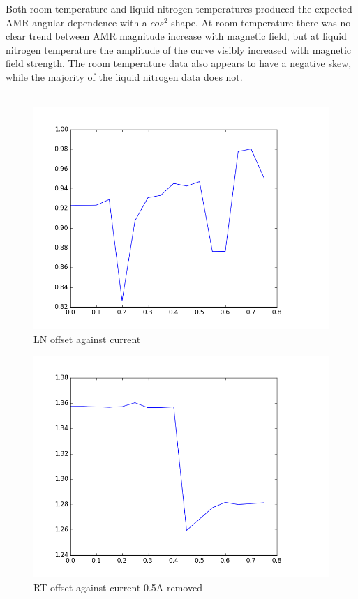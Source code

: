\documentclass[10pt, twocolumn]{revtex4}
\begin{document}
Both room temperature and liquid nitrogen temperatures produced the expected AMR angular dependence with a $cos^2$ shape. At room temperature there was no clear trend between  AMR magnitude increase with magnetic field, but at liquid nitrogen temperature the amplitude of the curve visibly increased with magnetic field strength. The room temperature data also appears to have a negative skew, while the majority of the liquid nitrogen data does not.\\
\\
\begin{figure}[H]
	\centering
	\includegraphics[width = \columnwidth]{LN_offsets.png}
	\caption{LN offset against current}
	\label{fig:horiz_LN_offset}
\end{figure}

\begin{figure}[H]
	\centering
	\includegraphics[width = \columnwidth]{RT_offsets.png}
	\caption{RT offset against current 0.5A removed}
	\label{fig:horiz_RT_offset}
\end{figure}
\end{document}
